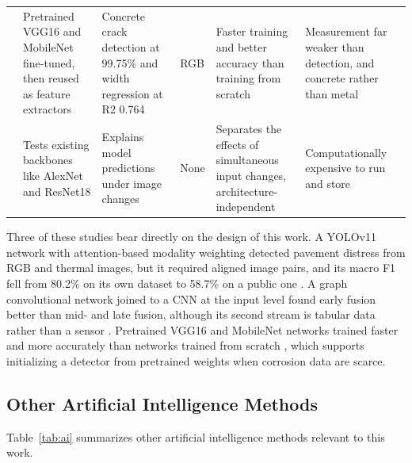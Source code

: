 {\begin{xltabular}{\textwidth}{p{0.95cm}>{\RaggedRight\arraybackslash}p{2.6cm}>{\RaggedRight\arraybackslash}p{2.6cm}>{\RaggedRight\arraybackslash}p{2.1cm}>{\RaggedRight\arraybackslash}X>{\RaggedRight\arraybackslash}X}
\citep{Su2024} & Pretrained VGG16 and MobileNet fine-tuned, then reused as feature extractors & Concrete crack detection at 99.75\% and width regression at R2 0.764 & RGB & Faster training and better accuracy than training from scratch & Measurement far weaker than detection, and concrete rather than metal \\
\citep{Kharyuk2026} & Tests existing backbones like AlexNet and ResNet18 & Explains model predictions under image changes & None & Separates the effects of simultaneous input changes, architecture-independent & Computationally expensive to run and store \\
\end{xltabular}
}


Three of these studies bear directly on the design of this work. A YOLOv11
network with attention-based modality weighting detected pavement distress from
RGB and thermal images, but it required aligned image pairs, and its macro F1
fell from 80.2\% on its own dataset to 58.7\% on a public one \citep{Zhang2026b}. A graph
convolutional network joined to a CNN at the input level found early fusion
better than mid- and late fusion, although its second stream is tabular data
rather than a sensor \citep{Chowdhury2026}. Pretrained VGG16 and MobileNet networks trained
faster and more accurately than networks trained from scratch \citep{Su2024}, which
supports initializing a detector from pretrained weights when corrosion data are
scarce.

\subsection{Other Artificial Intelligence Methods}

Table~\ref{tab:ai} summarizes other artificial intelligence methods relevant to
this work.

